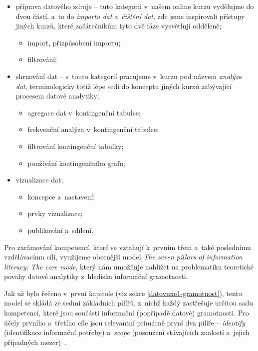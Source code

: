 \begin{itemize}
\tightlist
\item
  příprava datového zdroje -- tuto kategorii v~našem online kurzu vydělujme do dvou částí, a~to do \emph{importu dat} a~\emph{čištění dat}, zde jsme inspirovali přístupy jiných kurzů, které začátečníkům tyto dvě fáze vysvětlují odděleně;

  \begin{itemize}
  \tightlist
  \item
    import, přizpůsobení importu;
  \item
    filtrování;
  \end{itemize}
\item
  shrnování dat -- s~touto kategorií pracujeme v~kurzu pod názvem \emph{analýza dat}, terminologicky totiž lépe sedí do konceptu jiných kurzů zabývající procesem datové analytiky;

  \begin{itemize}
  \tightlist
  \item
    agregace dat v~kontingenční tabulce;
  \item
    frekvenční analýza v~kontingenční tabulce;
  \item
    filtrování kontingenční tabulky;
  \item
    používání kontingenčního grafu;
  \end{itemize}
\item
  vizualizace dat;

  \begin{itemize}
  \tightlist
  \item
    koncepce a~nastavení;
  \item
    prvky vizualizace;
  \item
    publikování a~sdílení.
  \end{itemize}
\end{itemize}

Pro zarámování kompetencí, které se vztahují k~prvním třem a~také poslednímu vzdělávacímu cíli, využijeme obecnější model \emph{The seven pillars of information literacy: The core mode}, který nám umožňuje nahlížet na problematiku teoretické povahy datové analytiky z~hlediska informační gramotnosti.

Jak už bylo řečeno v~první kapitole (viz sekce \ref{datovuxe1-gramotnost}), tento model se skládá ze sedmi základních pilířů, z~nichž každý zastřešuje určitou sadu kompetencí, které jsou součástí informační (popřípadě datové) gramotnosti. Pro účely prvního a~třetího cíle jsou relevantní primárně první dva pilíře -- \emph{identify} (identifikace informační potřeby) a~\emph{scope} (posouzení stávajících znalostí a~jejich případných mezer)~\parencite{sconul11}.

